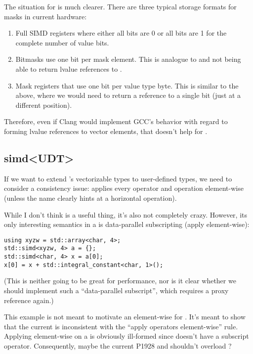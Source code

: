 The situation for \mask is much clearer.
There are three typical storage formats for masks in current hardware:
\begin{enumerate}
  \item Full SIMD registers where either all bits are 0 or all bits are 1 for
    the complete number of value bits.
  \item Bitmasks use one bit per mask element.
    This is analogue to  and  not being able to
    return lvalue references to .
  \item Mask registers that use one bit per value type byte.
    This is similar to the above, where we would need to return a reference to
    a single bit (just at a different position).
\end{enumerate}
Therefore, even if Clang would implement GCC's behavior with regard to forming
lvalue references to vector elements, that doesn't help for \mask.

\subsection{simd<UDT>}\label{sec:simd<array>}
If we want to extend \simd's vectorizable types to user-defined types, we need
to consider a consistency issue:
 applies every operator and operation element-wise (unless the
name clearly hints at a horizontal operation).

While I don't think  is a useful thing, it's also
not completely crazy.
However, its only interesting semantics in a \simd is data-parallel
subscripting (apply  element-wise):
\medskip\begin{lstlisting}[style=Vc]
using xyzw = std::array<char, 4>;
std::simd<xyzw, 4> a = {};
std::simd<char, 4> x = a[0];
x[0] = x + std::integral_constant<char, 1>();
\end{lstlisting}

(This is neither going to be great for performance, nor is it clear whether we
should implement such a “data-parallel subscript”, which requires a proxy
reference again.)

This example is not meant to motivate an element-wise  for .
It's meant to show that the current  is inconsistent
with the “apply operators element-wise” rule.
Applying  element-wise on a  is obviously
ill-formed since  doesn't have a subscript operator.
Consequently, maybe the current P1928 \simd and \mask shouldn't overload
?



